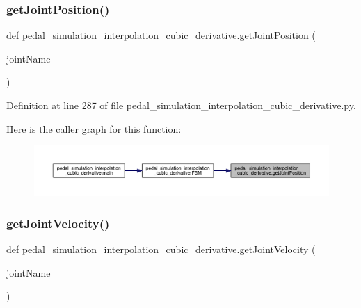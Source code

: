 \subsubsection{\texorpdfstring{getJointPosition()}{getJointPosition()}}
{\footnotesize\ttfamily def pedal\+\_\+simulation\+\_\+interpolation\+\_\+cubic\+\_\+derivative.\+get\+Joint\+Position (\begin{DoxyParamCaption}\item[{}]{joint\+Name }\end{DoxyParamCaption})}



Definition at line 287 of file pedal\+\_\+simulation\+\_\+interpolation\+\_\+cubic\+\_\+derivative.\+py.


\begin{DoxyCode}{0}

\end{DoxyCode}
Here is the caller graph for this function\+:\nopagebreak
\begin{figure}[H]
\begin{center}
\leavevmode
\includegraphics[width=350pt]{namespacepedal__simulation__interpolation__cubic__derivative_a315fe4c5bd2622f2d56a0fc6c3c5e143_icgraph}
\end{center}
\end{figure}
\mbox{\label{namespacepedal__simulation__interpolation__cubic__derivative_a24deb6472cb7522ba7982e8b0d12a4cf}} 
\subsubsection{\texorpdfstring{getJointVelocity()}{getJointVelocity()}}
{\footnotesize\ttfamily def pedal\+\_\+simulation\+\_\+interpolation\+\_\+cubic\+\_\+derivative.\+get\+Joint\+Velocity (\begin{DoxyParamCaption}\item[{}]{joint\+Name }\end{DoxyParamCaption})}



